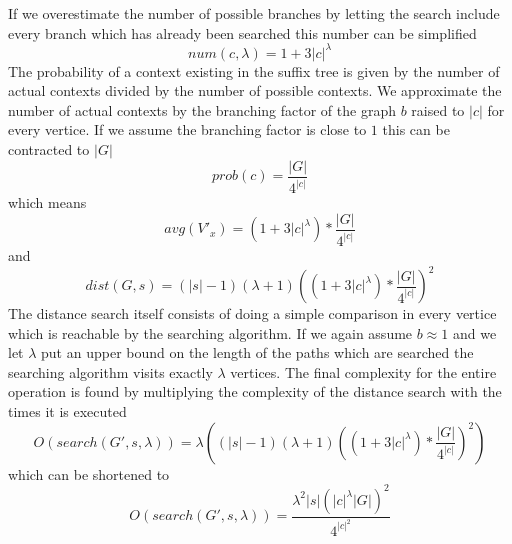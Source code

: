 \documentclass[thesis.tex]{subfiles}
\begin{document}
If we overestimate the number of possible branches by letting the search include every branch which has already been searched this number can be simplified
\begin{equation}
  num(c, \lambda) = 1 + 3|c|^{\lambda}
\end{equation}
The probability of a context existing in the suffix tree is given by the number of actual contexts divided by the number of possible contexts. We approximate the number of actual contexts by the branching factor of the graph $b$ raised to $|c|$ for every vertice. If we assume the branching factor is close to $1$ this can be contracted to $|G|$
\begin{equation}
  prob(c)=\dfrac{|G|}{4^{|c|}}
\end{equation}
which means
\begin{equation}
  avg(V'_x)=(1 + 3|c|^{\lambda})*\dfrac{|G|}{4^{|c|}}
\end{equation}
and
\begin{equation}
  dist(G, s) = (|s|-1)(\lambda +1)((1 + 3|c|^{\lambda})*\dfrac{|G|}{4^{|c|}})^2
\end{equation}
The distance search itself consists of doing a simple comparison in every vertice which is reachable by the searching algorithm. If we again assume $b \approx 1$ and we let $\lambda$ put an upper bound on the length of the paths which are searched the searching algorithm visits exactly $\lambda$ vertices. The final complexity for the entire operation is found by multiplying the complexity of the distance search with the times it is executed
\begin{equation}
  O(search(G', s, \lambda)) = \lambda( (|s|-1)(\lambda +1)((1 + 3|c|^{\lambda})*\dfrac{|G|}{4^{|c|}})^2)
\end{equation}
which can be shortened to
\begin{equation}
  O(search(G', s, \lambda)) = \dfrac{\lambda^2|s|(|c|^{\lambda}|G|)^2}{4^{|c|^2}}
\end{equation}
\end{document}

